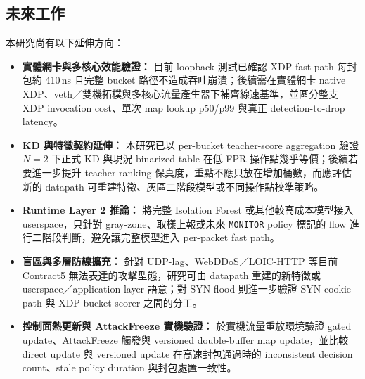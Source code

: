 \documentclass[12pt, a4paper, fontset=none]{ctexart}
\newcommand{\code}[1]{\texttt{#1}}
\begin{document}
\subsection{未來工作}
本研究尚有以下延伸方向：
\begin{itemize}
  \item \textbf{實體網卡與多核心效能驗證：} 目前 loopback 測試已確認 XDP fast path 每封包約 410\,ns 且完整 bucket 路徑不造成吞吐崩潰；後續需在實體網卡 native XDP、veth／雙機拓樸與多核心流量產生器下補齊線速基準，並區分整支 XDP invocation cost、單次 map lookup p50/p99 與真正 detection-to-drop latency。
  \item \textbf{KD 與特徵契約延伸：} 本研究已以 per-bucket teacher-score aggregation 驗證 $N=2$ 下正式 KD 與現況 binarized table 在低 FPR 操作點幾乎等價；後續若要進一步提升 teacher ranking 保真度，重點不應只放在增加桶數，而應評估新的 datapath 可重建特徵、灰區二階段模型或不同操作點校準策略。
  \item \textbf{Runtime Layer 2 推論：} 將完整 Isolation Forest 或其他較高成本模型接入 userspace，只針對 gray-zone、取樣上報或未來 \code{MONITOR} policy 標記的 flow 進行二階段判斷，避免讓完整模型進入 per-packet fast path。
  \item \textbf{盲區與多層防線擴充：} 針對 UDP-lag、WebDDoS／LOIC-HTTP 等目前 Contract5 無法表達的攻擊型態，研究可由 datapath 重建的新特徵或 userspace／application-layer 語意；對 SYN flood 則進一步驗證 SYN-cookie path 與 XDP bucket scorer 之間的分工。
  \item \textbf{控制面熱更新與 AttackFreeze 實機驗證：} 於實機流量重放環境驗證 gated update、AttackFreeze 觸發與 versioned double-buffer map update，並比較 direct update 與 versioned update 在高速封包通過時的 inconsistent decision count、stale policy duration 與封包處置一致性。
\end{itemize}
\end{document}
